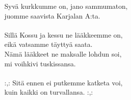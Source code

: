 
            Syvä kurkkumme on, jano sammumaton, \\
            juomme saavista Karjalan A:ta. \\
\hspace{10mm} \\
            Sillä Kossu ja kessu ne lääkkeemme on, \\
            eikä vatsamme täyttyä saata. \\
            Nämä lääkkeet ne maksalle lohdun soi, \\
            mi voihkivi tuskissansa. \\
\hspace{10mm} \\
            :,: Sitä ennen ei putkemme katketa voi, \\
            kuin kaikki on turvallansa. :,: \\
